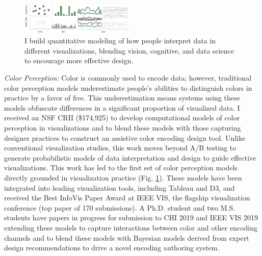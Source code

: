 \documentclass[11pt]{article}
\begin{document}
\begin{figure}
	\begin{center}
		\includegraphics[width=0.48\textwidth]{teaserOne.pdf}
	\end{center}
	\caption{I build quantitative modeling of how people interpret data in different visualizations, blending vision, cognitive, and data science to encourage more effective design.}\label{color}
\end{figure}

\emph{Color Perception: } Color is commonly used to encode data; however, traditional color perception models underestimate people's abilities to distinguish colors in practice by a favor of five. This underestimation means systems using these models obfuscate differences in a significant proportion of visualized data. %
I received an NSF CRII (\$174,925) to 
develop computational models of color perception in visualizations and to blend these models with those capturing designer practices to construct an assistive color encoding design tool.
Unlike conventional visualization studies, this work moves beyond A/B testing to generate probabilistic models of data interpretation and design to guide effective visualizations. 
This work has led to the first set of color perception models directly grounded in visualization practice
\cite{szafir2018Modeling} (Fig. \ref{color}). %
These models have been integrated into leading visualization tools, including Tableau and D3, and received the Best InfoVis Paper Award at IEEE VIS, the flagship visualization conference (top paper of 170 submissions). A Ph.D. student and two M.S. students have papers in progress for submission to CHI 2019 and IEEE VIS 2019 extending these models to capture interactions between color and other encoding channels and to blend these models with Bayesian models derived from expert design recommendations to drive a novel encoding authoring system.
\end{document}
